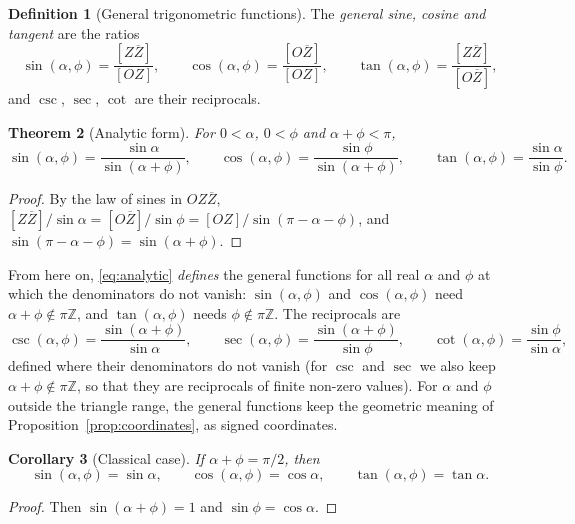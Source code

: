\documentclass[11pt]{amsart}
\newtheorem{thm}{Theorem}[section]
\newtheorem{cor}[thm]{Corollary}
\theoremstyle{definition}
\newtheorem{defn}[thm]{Definition}
\theoremstyle{remark}
\numberwithin{equation}{section}
\begin{document}
\begin{defn}[General trigonometric functions]
\label{defn:general}
The \emph{general sine, cosine and tangent} are the ratios
\[
\sin(\alpha,\phi) = \frac{[Z\overline{Z}]}{[OZ]}, \qquad
\cos(\alpha,\phi) = \frac{[O\overline{Z}]}{[OZ]}, \qquad
\tan(\alpha,\phi) = \frac{[Z\overline{Z}]}{[O\overline{Z}]},
\]
and $\csc$, $\sec$, $\cot$ are their reciprocals.
\end{defn}

\begin{thm}[Analytic form]
\label{thm:analytic}
For $0 < \alpha$, $0 < \phi$ and $\alpha + \phi < \pi$,
\begin{equation}
\label{eq:analytic}
\sin(\alpha,\phi) = \frac{\sin\alpha}{\sin(\alpha+\phi)}, \qquad
\cos(\alpha,\phi) = \frac{\sin\phi}{\sin(\alpha+\phi)}, \qquad
\tan(\alpha,\phi) = \frac{\sin\alpha}{\sin\phi}.
\end{equation}
\end{thm}

\begin{proof}
By the law of sines in $OZ\overline{Z}$,
$[Z\overline{Z}]/\sin\alpha = [O\overline{Z}]/\sin\phi
= [OZ]/\sin(\pi-\alpha-\phi)$, and $\sin(\pi-\alpha-\phi) = \sin(\alpha+\phi)$.
\end{proof}

From here on, \eqref{eq:analytic} \emph{defines} the general functions
for all real $\alpha$ and $\phi$ at which the denominators do not vanish:
$\sin(\alpha,\phi)$ and $\cos(\alpha,\phi)$ need $\alpha+\phi \notin \pi\mathbb{Z}$,
and $\tan(\alpha,\phi)$ needs $\phi \notin \pi\mathbb{Z}$. The reciprocals are
\[
\csc(\alpha,\phi) = \frac{\sin(\alpha+\phi)}{\sin\alpha}, \qquad
\sec(\alpha,\phi) = \frac{\sin(\alpha+\phi)}{\sin\phi}, \qquad
\cot(\alpha,\phi) = \frac{\sin\phi}{\sin\alpha},
\]
defined where their denominators do not vanish (for $\csc$ and $\sec$ we
also keep $\alpha+\phi \notin \pi\mathbb{Z}$, so that they are reciprocals
of finite non-zero values).
For $\alpha$ and $\phi$ outside the triangle range, the general functions
keep the geometric meaning of Proposition~\ref{prop:coordinates}, as signed
coordinates.

\begin{cor}[Classical case]
\label{cor:classical}
If $\alpha + \phi = \pi/2$, then
\[
\sin(\alpha,\phi) = \sin\alpha, \qquad \cos(\alpha,\phi) = \cos\alpha, \qquad
\tan(\alpha,\phi) = \tan\alpha .
\]
\end{cor}

\begin{proof}
Then $\sin(\alpha+\phi) = 1$ and $\sin\phi = \cos\alpha$.
\end{proof}
\end{document}
